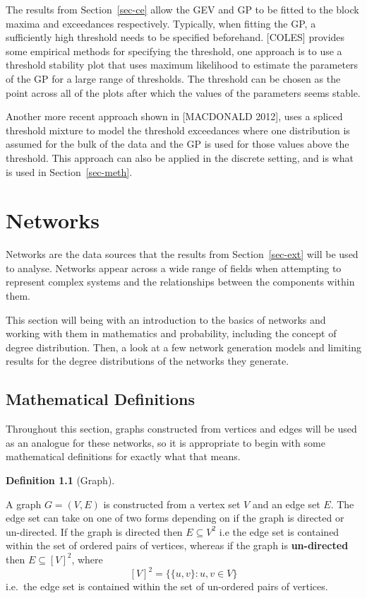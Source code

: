 \documentclass[
  10pt,
  a4paper,
]{scrreprt}
\theoremstyle{plain}
\theoremstyle{plain}
\theoremstyle{plain}
\theoremstyle{definition}
\newtheorem{definition}{Definition}[section]
\theoremstyle{remark}
\begin{document}
{The results from Section~\ref{sec-ce} allow the GEV and GP to be fitted
to the block maxima and exceedances respectively. Typically, when
fitting the GP, a sufficiently high threshold needs to be specified
beforehand. {[}COLES{]} provides some empirical methods for specifying
the threshold, one approach is to use a threshold stability plot that
uses maximum likelihood to estimate the parameters of the GP for a large
range of thresholds. The threshold can be chosen as the point across all
of the plots after which the values of the parameters seems stable.

Another more recent approach shown in {[}MACDONALD 2012{]}, uses a
spliced threshold mixture to model the threshold exceedances where one
distribution is assumed for the bulk of the data and the GP is used for
those values above the threshold. This approach can also be applied in
the discrete setting, and is what is used in Section~\ref{sec-meth}.

\hypertarget{sec-net}{%
\chapter{Networks}\label{sec-net}}

Networks are the data sources that the results from
Section~\ref{sec-ext} will be used to analyse. Networks appear across a
wide range of fields when attempting to represent complex systems and
the relationships between the components within them.

This section will being with an introduction to the basics of networks
and working with them in mathematics and probability, including the
concept of degree distribution. Then, a look at a few network generation
models and limiting results for the degree distributions of the networks
they generate.

\hypertarget{mathematical-definitions}{%
\section{Mathematical Definitions}\label{mathematical-definitions}}

Throughout this section, graphs constructed from vertices and edges will
be used as an analogue for these networks, so it is appropriate to begin
with some mathematical definitions for exactly what that means.

\begin{definition}[Graph]\protect\hypertarget{def-net}{}\label{def-net}

A graph \(G = (V,E)\) is constructed from a vertex set \(V\) and an edge
set \(E\). The edge set can take on one of two forms depending on if the
graph is directed or un-directed. If the graph is directed then
\(E\subseteq V^2\) i.e the edge set is contained within the set of
ordered pairs of vertices, whereas if the graph is \textbf{un-directed}
then \(E\subseteq [V]^2\), where \[
[V]^2 = \{\{u,v\}:u,v\in V\}
\] i.e.~the edge set is contained within the set of un-ordered pairs of
vertices.


\end{definition}}
\end{document}
